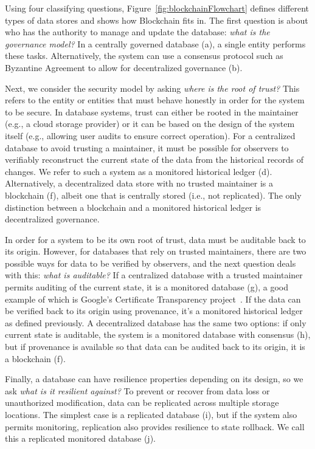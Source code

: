 {Using four classifying questions, Figure~\ref{fig:blockchainFlowchart} defines different types of data stores and shows how Blockchain fits in. The first question is about who has the authority to manage and update the database: \emph{what is the governance model?} In a centrally governed database (a), a single entity performs these tasks. Alternatively, the system can use a consensus protocol such as Byzantine Agreement to allow for decentralized governance (b).

Next, we consider the security model by asking \emph{where is the root of trust?} This refers to the entity or entities that must behave honestly in order for the system to be secure. In database systems, trust can either be rooted in the maintainer (e.g., a cloud storage provider) or it can be based on the design of the system itself (e.g., allowing user audits to ensure correct operation). For a centralized database to avoid trusting a maintainer, it must be possible for observers to verifiably reconstruct the current state of the data from the historical records of changes. We refer to such a system as a monitored historical ledger (d). Alternatively, a decentralized data store with no trusted maintainer is a blockchain (f), albeit one that is centrally stored (i.e., not replicated). The only distinction between a blockchain and a monitored historical ledger is decentralized governance.

In order for a system to be its own root of trust, data must be auditable back to its origin. However, for databases that rely on trusted maintainers, there are two possible ways for data to be verified by observers, and the next question deals with this: \emph{what is auditable?} If a centralized database with a trusted maintainer permits auditing of the current state, it is a monitored database (g), a good example of which is Google's Certificate Transparency project~\cite{CT}. If the data can be verified back to its origin using provenance, it's a monitored historical ledger as defined previously. A decentralized database has the same two options: if only current state is auditable, the system is a monitored database with consensus (h), but if provenance is available so that data can be audited back to its origin, it is a blockchain (f).

Finally, a database can have resilience properties depending on its design, so we ask \emph{what is it resilient against?} To prevent or recover from data loss or unauthorized modification, data can be replicated across multiple storage locations. The simplest case is a replicated database (i), but if the system also permits monitoring, replication also provides resilience to state rollback. We call this a replicated monitored database (j).

}
